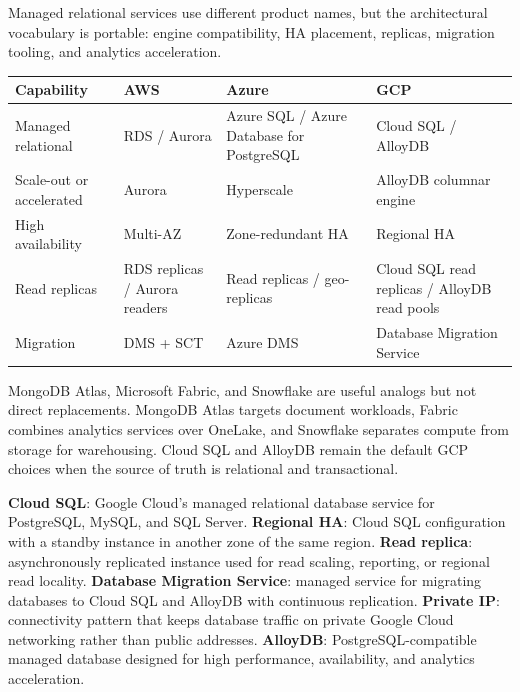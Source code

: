 \begin{crosscloud}
Managed relational services use different product names, but the architectural vocabulary is portable: engine compatibility, HA placement, replicas, migration tooling, and analytics acceleration.

\vspace{2mm}
{\footnotesize
\begin{tabular}{@{}p{2.8cm}p{3.0cm}p{3.0cm}p{3.0cm}@{}}
\toprule
\textbf{Capability} & \textbf{AWS} & \textbf{Azure} & \textbf{GCP} \\
\midrule
Managed relational & RDS / Aurora & Azure SQL / Azure Database for PostgreSQL & Cloud SQL / AlloyDB \\
Scale-out or accelerated & Aurora & Hyperscale & AlloyDB columnar engine \\
High availability & Multi-AZ & Zone-redundant HA & Regional HA \\
Read replicas & RDS replicas / Aurora readers & Read replicas / geo-replicas & Cloud SQL read replicas / AlloyDB read pools \\
Migration & DMS + SCT & Azure DMS & Database Migration Service \\
\bottomrule
\end{tabular}}

\vspace{1mm}
MongoDB Atlas, Microsoft Fabric, and Snowflake are useful analogs but not direct replacements. MongoDB Atlas targets document workloads, Fabric combines analytics services over OneLake, and Snowflake separates compute from storage for warehousing. Cloud SQL and AlloyDB remain the default GCP choices when the source of truth is relational and transactional.
\end{crosscloud}

\begin{keyterms}
\textbf{Cloud SQL}: Google Cloud's managed relational database service for PostgreSQL, MySQL, and SQL Server.
\textbf{Regional HA}: Cloud SQL configuration with a standby instance in another zone of the same region.
\textbf{Read replica}: asynchronously replicated instance used for read scaling, reporting, or regional read locality.
\textbf{Database Migration Service}: managed service for migrating databases to Cloud SQL and AlloyDB with continuous replication.
\textbf{Private IP}: connectivity pattern that keeps database traffic on private Google Cloud networking rather than public addresses.
\textbf{AlloyDB}: PostgreSQL-compatible managed database designed for high performance, availability, and analytics acceleration.
\end{keyterms}

